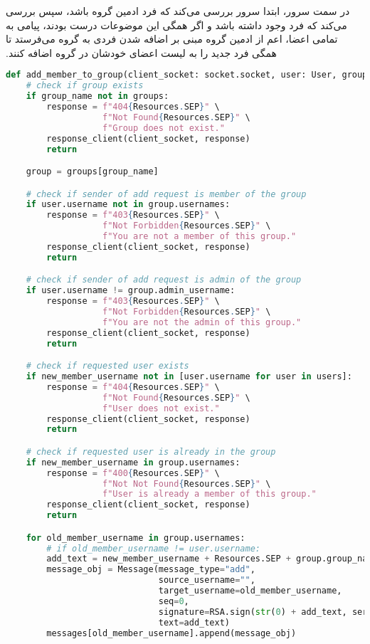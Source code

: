 ‫در سمت سرور، ابتدا سرور بررسی می‌کند که فرد ادمین گروه باشد، سپس بررسی می‌کند که فرد وجود داشته باشد و اگر همگی این موضوعات درست بودند، پیامی به تمامی اعضا، اعم از ادمین گروه مبنی بر اضافه شدن فردی به گروه می‌فرستد تا همگی فرد جدید را به لیست اعضای خودشان در گروه اضافه کنند.
‫
\begin{latin}
\begin{lstlisting}[firstnumber=250, language=Python]
def add_member_to_group(client_socket: socket.socket, user: User, group_name, new_member_username):
    # check if group exists
    if group_name not in groups:
        response = f"404{Resources.SEP}" \
                   f"Not Found{Resources.SEP}" \
                   f"Group does not exist."
        response_client(client_socket, response)
        return

    group = groups[group_name]

    # check if sender of add request is member of the group
    if user.username not in group.usernames:
        response = f"403{Resources.SEP}" \
                   f"Not Forbidden{Resources.SEP}" \
                   f"You are not a member of this group."
        response_client(client_socket, response)
        return

    # check if sender of add request is admin of the group
    if user.username != group.admin_username:
        response = f"403{Resources.SEP}" \
                   f"Not Forbidden{Resources.SEP}" \
                   f"You are not the admin of this group."
        response_client(client_socket, response)
        return

    # check if requested user exists
    if new_member_username not in [user.username for user in users]:
        response = f"404{Resources.SEP}" \
                   f"Not Found{Resources.SEP}" \
                   f"User does not exist."
        response_client(client_socket, response)
        return

    # check if requested user is already in the group
    if new_member_username in group.usernames:
        response = f"400{Resources.SEP}" \
                   f"Not Not Found{Resources.SEP}" \
                   f"User is already a member of this group."
        response_client(client_socket, response)
        return

    for old_member_username in group.usernames:
        # if old_member_username != user.username:
        add_text = new_member_username + Resources.SEP + group.group_name
        message_obj = Message(message_type="add",
                              source_username="",
                              target_username=old_member_username,
                              seq=0,
                              signature=RSA.sign(str(0) + add_text, server_private_key),
                              text=add_text)
        messages[old_member_username].append(message_obj)


\end{lstlisting}
\end{latin}
